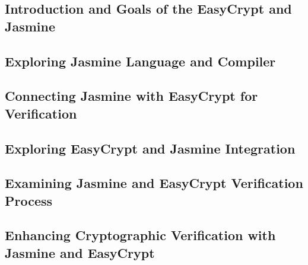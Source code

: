 \subsection{Introduction and Goals of the EasyCrypt and Jasmine}

\subsection{Exploring Jasmine Language and Compiler}
\subsection{Connecting Jasmine with EasyCrypt for Verification}
\subsection{Exploring EasyCrypt and Jasmine Integration}
\subsection{Examining Jasmine and EasyCrypt Verification Process}
\subsection{Enhancing Cryptographic Verification with Jasmine and EasyCrypt}